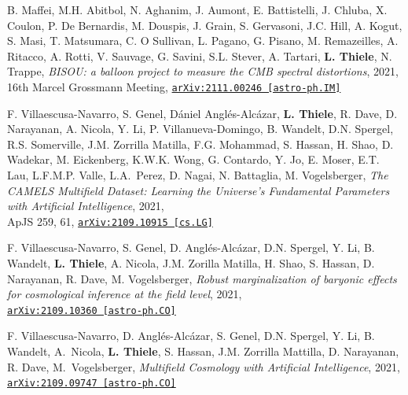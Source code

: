 \begin{minipage}{\textwidth}
B. Maffei, M.H. Abitbol, N. Aghanim, J. Aumont, E. Battistelli, J. Chluba, X. Coulon, P. De Bernardis, M. Douspis, J. Grain, S. Gervasoni, J.C. Hill, A. Kogut, S. Masi, T. Matsumara, C. O Sullivan, L. Pagano, G. Pisano, M. Remazeilles, A. Ritacco, A. Rotti, V. Sauvage, G. Savini, S.L. Stever, A. Tartari, {\bf L. Thiele}, N. Trappe,
\emph{BISOU: a balloon project to measure the CMB spectral distortions}, 2021,\\
16th Marcel Grossmann Meeting,
\href{https://arxiv.org/abs/2111.00246}{\mbox{\texttt{arXiv:2111.00246 [astro-ph.IM]}}}
\end{minipage}

\begin{minipage}{\textwidth}
F. Villaescusa-Navarro, S. Genel, D\'aniel Angl\'es-Alc\'azar, {\bf L. Thiele}, R. Dave, D. Narayanan, A. Nicola, Y. Li, P. Villanueva-Domingo, B. Wandelt, D.N. Spergel, R.S. Somerville, J.M. Zorrilla Matilla, F.G. Mohammad, S. Hassan, H. Shao, D. Wadekar, M. Eickenberg, K.W.K. Wong, G. Contardo, Y. Jo, E. Moser, E.T. Lau, L.F.M.P. Valle, L.A.~Perez, D. Nagai, N. Battaglia, M. Vogelsberger,
\emph{The CAMELS Multifield Dataset: Learning the Universe's Fundamental Parameters with Artificial Intelligence}, 2021,\\
ApJS 259, 61,
\href{https://arxiv.org/abs/2109.10915}{\mbox{\texttt{arXiv:2109.10915 [cs.LG]}}}
\end{minipage}

\begin{minipage}{\textwidth}
F. Villaescusa-Navarro, S. Genel, D. Angl\'es-Alc\'azar, D.N. Spergel, Y. Li, B. Wandelt, {\bf L. Thiele}, A. Nicola, J.M. Zorilla Matilla, H. Shao, S. Hassan, D. Narayanan, R. Dave, M. Vogelsberger,
\emph{Robust marginalization of baryonic effects for cosmological inference at the field level}, 2021,\\
\href{https://arxiv.org/abs/2109.10360}{\mbox{\texttt{arXiv:2109.10360 [astro-ph.CO]}}}
\end{minipage}

\begin{minipage}{\textwidth}
F. Villaescusa-Navarro, D. Angl\'es-Alc\'azar, S. Genel, D.N. Spergel, Y. Li, B. Wandelt, A.~Nicola, {\bf L. Thiele}, S. Hassan, J.M. Zorrilla Mattilla, D. Narayanan, R. Dave, M.~Vogelsberger,
\emph{Multifield Cosmology with Artificial Intelligence}, 2021,\\
\href{https://arxiv.org/abs/2109.09747}{\mbox{\texttt{arXiv:2109.09747 [astro-ph.CO]}}}
\end{minipage}

